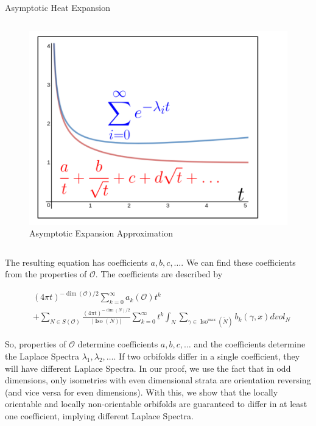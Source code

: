 \documentclass[final]{beamer}
\newlength{\onecolwid}
\newcommand{\myabs}[1]{\vert#1\vert}
\DeclareMathOperator{\iso}{Iso}
\begin{document}
\begin{frame}[t]
\begin{columns}[t]
\begin{column}{\onecolwid}
\begin{block}{Asymptotic Heat Expansion}
\begin{columns}[t]
\begin{column}[c]{0.55\textwidth}
\begin{figure}
        \includegraphics[width=\textwidth]{images/heat_exp_graph2.png}
        \caption{Asymptotic Expansion Approximation}
        \label{fig:asym_aprox}
        \end{figure}
        \end{column}
        \end{columns}
        The resulting equation has coefficients $a,b,c,\dots$. We can find
        these coefficients from the properties of $\mathcal{O}$. The
        coefficients are described by
        
       \begin{align*}
           &{(4\pi t)}^{-\dim(\mathcal{O})/2}\sum_{k=0}^{\infty}a_k(\mathcal{O})t^k \\
            &+\sum_{N \in S(\mathcal{O})}\frac{{(4\pi t)}^{-\dim(N)/2}}{\myabs{\iso(N)}}\sum_{k=0}^{\infty}t^k\int_{N} \sum_{\gamma \in \iso^{\max}(\tilde{N})}b_k(\gamma,x) dvol_N
       \end{align*}
        
        So, properties of $\mathcal{O}$ determine coefficients
        $a,b,c,\dots$ and the coefficients determine the Laplace Spectra
        $\lambda_1,\lambda_2,\dots$. If two orbifolds differ in a
        single coefficient, they will have different Laplace Spectra.  In
        our proof, we use the fact that in odd dimensions, only isometries
        with even dimensional strata are orientation reversing (and vice
        versa for even dimensions). With this, we show that the
        locally orientable and locally non-orientable orbifolds are
        guaranteed to differ in at least one coefficient, implying different
        Laplace Spectra.


\end{block}
\end{column}
\end{columns}
\end{frame}
\end{document}
